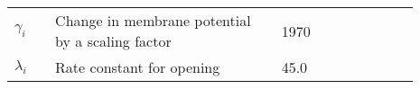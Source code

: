 \documentclass[fleqn]{report}
\numberwithin{equation}{section}
\numberwithin{equation}{section}
\newcommand{\NO}{\text{NO}}
\newcommand{\NOi}{\text{[NO]$_i$}}
\newcommand{\cGMP}{\text{cGMP}}
\newcommand{\uMpers}{\textmu M\,s$^{-1}$}
\newcommand{\n}{$^{-1}$}
\newcommand\pNO[1]{\text{$p_{\text{NO},#1}$}}
\newcommand\cNO[1]{\text{$c_{\text{NO},#1}$}}
\newcommand\dNO[1]{\text{$d_{\text{NO},#1}$}}
\begin{document}
	\begin{table}[h!]
	\centering
	\begin{tabular}{ p{0.09\linewidth}  >{\footnotesize} p{0.5\linewidth}  >{\footnotesize} p{0.27\linewidth} >{\footnotesize} p{0.03\linewidth} }
	\hline
	$\gamma_{i}$				& Change in membrane potential by a scaling factor					& 1970 \mVpuM	& \cite{Koenigsberger2006} \\
	$\lambda_{i} $				& Rate constant for opening											& 45.0 \pers 	& \cite{Koenigsberger2006} \\
	\hline
	\end{tabular}
	\label{tab:dcidt}
	\end{table}
%				
%				
%	
%				
%				
%	       		
\end{document}
